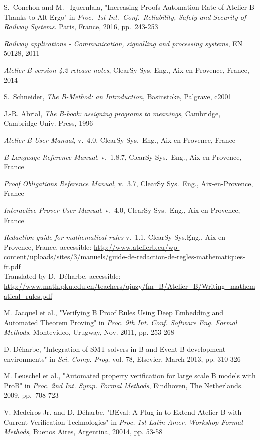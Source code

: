 \documentclass[11pt,journal]{IEEEtran}
\begin{document}
	\begin{thebibliography}{1}
		S.~Conchon and M.~ Iguernlala, "Increasing Proofs Automation Rate of Atelier-B Thanks to Alt-Ergo" in \emph{Proc.~1st Int.~Conf.~Reliability, Safety and Security of Railway Systems}. Paris, France, 2016, pp.~243-253
		
		\emph{Railway applications - Communication, signalling and processing systems}, EN 50128, 2011
		
		\emph{Atelier B version 4.2 release notes}, ClearSy Sys. Eng., Aix-en-Provence, France, 2014
		
		S.~Schneider, \emph{The B-Method: an Introduction}, Basinstoke, Palgrave, c2001
		
		J.-R. Abrial, \emph{The B-book: assigning programs to meanings}, Cambridge, Cambridge Univ. Press, 1996
		
		\emph{Atelier B User Manual}, v.~4.0, ClearSy Sys.~Eng., Aix-en-Provence, France
		
		\emph{B Language Reference Manual}, v.~1.8.7, ClearSy Sys.~Eng., Aix-en-Provence, France
		
		\emph{Proof Obligations Reference Manual}, v.~3.7, ClearSy Sys.~Eng., Aix-en-Provence, France
		
		\emph{Interactive Prover User Manual}, v.~4.0, ClearSy Sys.~Eng., Aix-en-Provence, France
		
		\emph{Redaction guide for mathematical rules} v.~1.1, ClearSy Sys.Ęng., Aix-en-Provence, France, accessible: \url{http://www.atelierb.eu/wp-content/uploads/sites/3/manuels/guide-de-redaction-de-regles-mathematiques-fr.pdf}\\
		Translated by D.~D\'{e}harbe, accessible: 
		\url{http://www.math.pku.edu.cn/teachers/qiuzy/fm_B/Atelier_B/Writing_mathematical_rules.pdf}
		
		M. Jacquel et al., "Verifying B Proof Rules Using Deep Embedding and Automated Theorem Proving" in \emph{Proc. 9th Int. Conf. Software Eng. Formal Methods}, Montevideo, Urugway, Nov. 2011, pp. 253-268
		
		D. D\'{e}harbe, "Integration of SMT-solvers in B and Event-B development environments" in \emph{Sci. Comp. Prog.} vol. 78, Elsevier, March 2013, pp. 310-326
		
		M. Leuschel et al., "Automated property verification for large scale B models with ProB" in \emph{Proc. 2nd Int. Symp. Formal Methods}, Eindhoven, The Netherlands. 2009, pp.~708-723
		
		V. Medeiros Jr. and D. D\'{e}harbe, "BEval: A Plug-in to Extend Atelier B with Current Verification Technologies" in \emph{Proc. 1st Latin Amer. Workshop Formal Methods}, Buenos Aires, Argentina, 20014, pp. 53-58
		

		
	\end{thebibliography}
\end{document}

